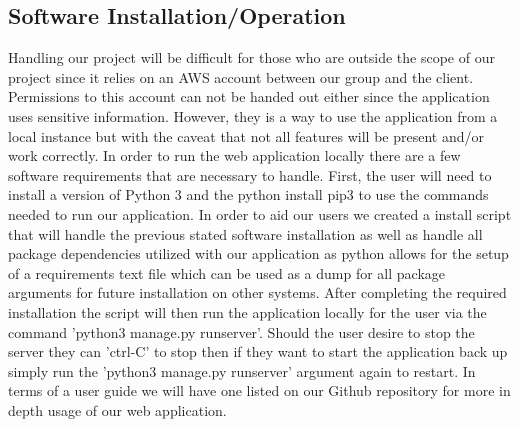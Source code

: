 \subsection{Software Installation/Operation}
\noindent Handling our project will be difficult for those who are outside the scope of our project since it relies on an AWS account between our group and the client. Permissions to this account can not be handed out either since the application uses sensitive information. However, they is a way to use the application from a local instance but with the caveat that not all features will be present and/or work correctly. In order to run the web application locally there are a few software requirements that are necessary to handle. First, the user will need to install a version of Python 3 and the python install pip3 to use the commands needed to run our application. In order to aid our users we created a install script that will handle the previous stated software installation as well as handle all package dependencies utilized with our application as python allows for the setup of a requirements text file which can be used as a dump for all package arguments for future installation on other systems. After completing the required installation the script will then run the application locally for the user via the command 'python3 manage.py runserver'. Should the user desire to stop the server they can 'ctrl-C' to stop then if they want to start the application back up simply run the 'python3 manage.py runserver' argument again to restart. In terms of a user guide we will have one listed on our Github repository for more in depth usage of our web application.    